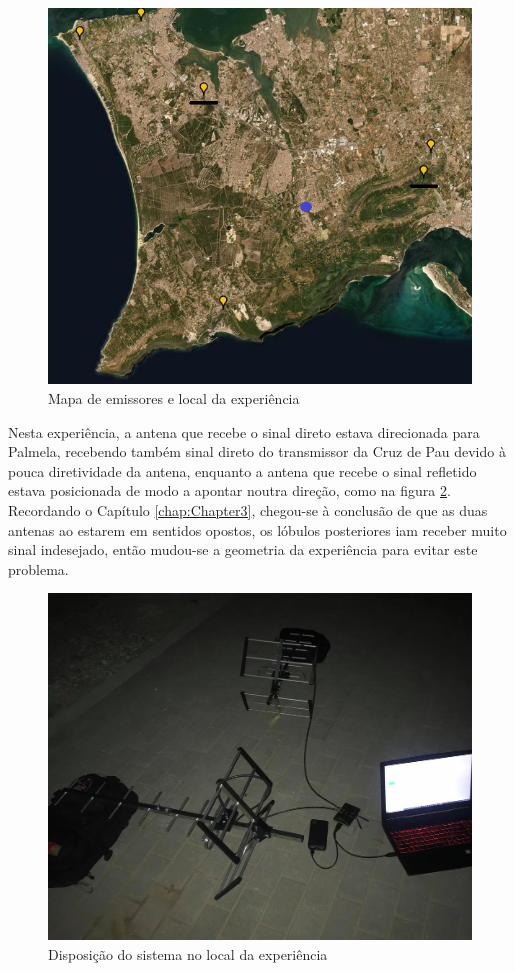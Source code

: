 \begin{figure}[h]
\centering
\includegraphics[scale=0.75]{chapters/ch5/assets/mapaemi}
\caption[Mapa de emissores e local da experiência]{Mapa de emissores e local da experiência}
\label{fig:mapaemi}
\end{figure}

Nesta experiência, a antena que recebe o sinal direto estava direcionada para Palmela, recebendo também sinal direto do transmissor da Cruz de Pau devido à pouca diretividade da antena, enquanto a antena que recebe o sinal refletido estava posicionada de modo a apontar noutra direção, como na figura \ref{fig:prat}. Recordando o Capítulo \ref{chap:Chapter3}, chegou-se à conclusão de que as duas antenas ao estarem em sentidos opostos, os lóbulos posteriores iam receber muito sinal indesejado, então mudou-se a geometria da experiência para evitar este problema.

\begin{figure}[h]
\centering
\includegraphics[scale=0.25]{chapters/ch5/assets/prat2}
\caption[Disposição do sistema]{Disposição do sistema no local da experiência}
\label{fig:prat}
\end{figure}

